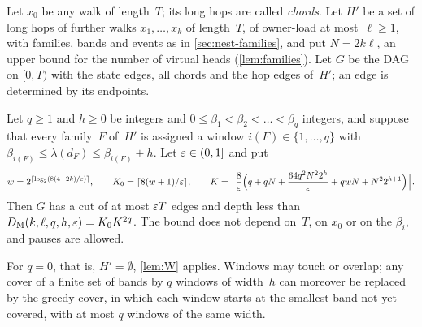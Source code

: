 Let $x_0$ be any walk of length~$T$; its long hops are called \emph{chords}. Let $H'$ be a set of long hops of further
walks $x_1,\dots,x_k$ of length~$T$, of owner-load at most~$\ell\ge1$, with families, bands and events as in
\cref{sec:nest-families}, and put $N=2k\ell$, an upper bound for the number of virtual heads (\cref{lem:families}).
Let $G$ be the DAG on $[0,T)$ with the state edges, all chords and the hop edges of~$H'$; an edge is determined by its
endpoints.

\begin{theorem}\label{thm:M}
Let $q\ge1$ and $h\ge0$ be integers and $0\le\beta_1<\beta_2<\dots<\beta_q$ integers, and suppose that every family~$F$
of~$H'$ is assigned a window $i(F)\in\{1,\dots,q\}$ with $\beta_{i(F)}\le\lambda(d_F)\le\beta_{i(F)}+h$. Let
$\varepsilon\in(0,1]$ and put
\[
  w=2^{\lceil\log_2(8(4+2k)/\varepsilon)\rceil},\qquad K_0=\lceil8(w+1)/\varepsilon\rceil,\qquad
  K=\Bigl\lceil\frac8{\varepsilon}\Bigl(q+qN+\frac{64q^2N^22^h}{\varepsilon}+qwN+N^22^{h+1}\Bigr)\Bigr\rceil.
\]
Then $G$ has a cut of at most $\varepsilon T$ edges and depth less than $D_{\mathrm M}(k,\ell,q,h,\varepsilon)=K_0K^{2q}$. The bound does not
depend on~$T$, on $x_0$ or on the $\beta_i$, and pauses are allowed.
\end{theorem}

For $q=0$, that is, $H'=\emptyset$, \cref{lem:W} applies. Windows may touch or overlap; any cover of a finite set of bands
by $q$ windows of width~$h$ can moreover be replaced by the greedy cover, in which each window starts at the smallest band
not yet covered, with at most $q$ windows of the same width.

